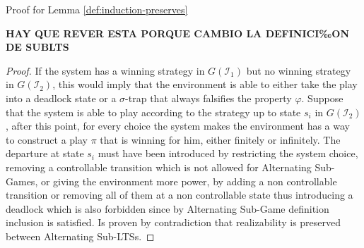 Proof for Lemma \ref{def:induction-preserves}


\textbf{HAY QUE REVER ESTA PORQUE CAMBIO LA DEFINICI‰ON DE SUBLTS}
\begin{proof}
If the system has a winning strategy in $G(\mathcal{I}_1)$ but no
winning strategy in $G(\mathcal{I}_2)$, this would imply that
the environment is able to either take the play into a deadlock state
or a $\sigma$-trap that always falsifies the property $\varphi$. 
Suppose that the system is able to play according to the strategy up
to state $s_i$ in $G(\mathcal{I}_2)$, after this point, for every choice the
system makes the environment has a way to construct a play
$\pi$ that is winning for him, either finitely or infinitely.
The departure at state $s_i$ must have been introduced by 
restricting the system choice, removing a controllable transition
which is not allowed for Alternating Sub-Games, or giving the environment
more power, by adding a non controllable transition or removing all of them
at a non controllable state thus introducing a deadlock which is also
forbidden since by Alternating Sub-Game definition
inclusion is satisfied.  Is proven by contradiction
that realizability is preserved between Alternating Sub-LTSs.
\end{proof}

